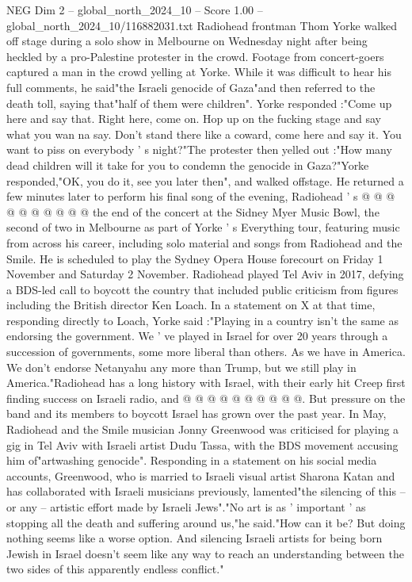 \begin{textsample}{NEG Dim 2 – global\_north\_2024\_10 – Score 1.00 – global\_north\_2024\_10/116882031.txt}  \label{ex:f2_neg_108}
Radiohead frontman Thom Yorke walked off stage during a solo show in Melbourne on Wednesday night after being heckled by a pro-Palestine protester in the crowd.
Footage from concert-goers captured a man in the crowd yelling at Yorke.
While it was difficult to hear his full comments, he said"the Israeli genocide of Gaza"and then referred to the death toll, saying that"half of them were children".
Yorke responded :"Come up here and say that.
Right here, come on.
Hop up on the fucking stage and say what you wan na say.
Don't stand there like a coward, come here and say it.
You want to piss on everybody ' s night?"The protester then yelled out :"How many dead children will it take for you to condemn the genocide in Gaza?"Yorke responded,"OK, you do it, see you later then", and walked offstage.
He returned a few minutes later to perform his final song of the evening, Radiohead ' s @ @ @ @ @ @ @ @ @ @ the end of the concert at the Sidney Myer Music Bowl, the second of two in Melbourne as part of Yorke ' s Everything tour, featuring music from across his career, including solo material and songs from Radiohead and the Smile.
He is scheduled to play the Sydney Opera House forecourt on Friday 1 November and Saturday 2 November.
Radiohead played Tel Aviv in 2017, defying a BDS-led call to boycott the country that included public criticism from figures including the British director Ken Loach.
In a statement on X at that time, responding directly to Loach, Yorke said :"Playing in a country isn't the same as endorsing the government.
We ' ve played in Israel for over 20 years through a succession of governments, some more liberal than others.
As we have in America.
We don't endorse Netanyahu any more than Trump, but we still play in America."Radiohead has a long history with Israel, with their early hit Creep first finding success on Israeli radio, and @ @ @ @ @ @ @ @ @ @.
But pressure on the band and its members to boycott Israel has grown over the past year.
In May, Radiohead and the Smile musician Jonny Greenwood was criticised for playing a gig in Tel Aviv with Israeli artist Dudu Tassa, with the BDS movement accusing him of"artwashing genocide".
Responding in a statement on his social media accounts, Greenwood, who is married to Israeli visual artist Sharona Katan and has collaborated with Israeli musicians previously, lamented"the silencing of this -- or any -- artistic effort made by Israeli Jews"."No art is as ' important ' as stopping all the death and suffering around us,"he said."How can it be?
But doing nothing seems like a worse option.
And silencing Israeli artists for being born Jewish in Israel doesn't seem like any way to reach an understanding between the two sides of this apparently endless conflict."

\end{textsample}

